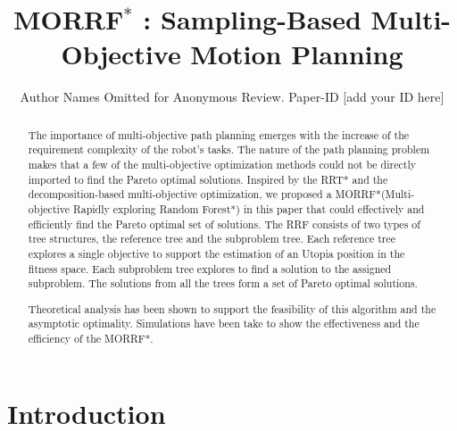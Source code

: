 \documentclass[conference]{IEEEtran}
\begin{document}
\title{ MORRF$^{*}$ : Sampling-Based Multi-Objective Motion Planning }

\author{Author Names Omitted for Anonymous Review. Paper-ID [add your ID here]}

\maketitle

\begin{abstract}
The importance of multi-objective path planning emerges with the increase of the requirement complexity of the robot's tasks.
The nature of the path planning problem makes that a few of the multi-objective optimization methods could not be directly imported to find the Pareto optimal solutions.
Inspired by the RRT* and the decomposition-based multi-objective optimization, we proposed a MORRF*(Multi-objective Rapidly exploring Random Forest*) in this paper that could effectively and efficiently find the Pareto optimal set of solutions.
The RRF consists of two types of tree structures, the reference tree and the subproblem tree.
Each reference tree explores a single objective to support the estimation of an Utopia position in the fitness space.
Each subproblem tree explores to find a solution to the assigned subproblem.
The solutions from all the trees form a set of Pareto optimal solutions. 

Theoretical analysis has been shown to support the feasibility of this algorithm and the asymptotic optimality. 
Simulations have been take to show the effectiveness and the efficiency of the MORRF*.
\end{abstract}

\IEEEpeerreviewmaketitle

\section{Introduction}
\label{sec:intro}
\end{document}
